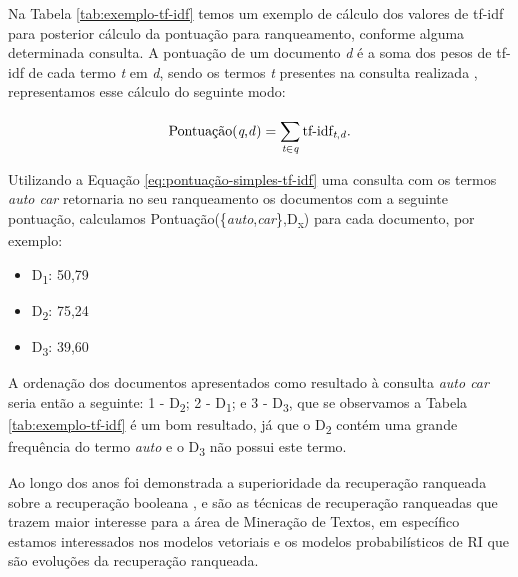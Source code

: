 

Na Tabela \ref{tab:exemplo-tf-idf} temos um exemplo de cálculo dos valores de tf-idf para posterior cálculo da pontuação para ranqueamento, conforme alguma determinada consulta. 
A pontuação de um documento \textit{d} é a soma dos pesos de tf-idf de cada termo \textit{t} em \textit{d}, sendo os termos \textit{t} presentes na consulta realizada \cite[p.~109]{Manning2008IIR}, representamos esse cálculo do seguinte modo:

\begin{equation}
    \label{eq:pontuação-simples-tf-idf}
    \text{Pontuação(\textit{q},\textit{d})} = \sum_{\textit{t} \in \textit{q}}^{} \text{tf-idf}_{\text{\textit{t},\textit{d}}}.
\end{equation}


Utilizando a Equação \ref{eq:pontuação-simples-tf-idf} uma consulta com os termos \textit{auto car} retornaria no seu ranqueamento os documentos com a seguinte pontuação, calculamos Pontuação(\{\textit{auto},\textit{car}\},D\textsubscript{x}) para cada documento, por exemplo:
\begin{itemize}
    \setlength\itemsep{-0.2em}
    \item D\textsubscript{1}: 50,79
    \item D\textsubscript{2}: 75,24
    \item D\textsubscript{3}: 39,60
\end{itemize}

A ordenação dos documentos apresentados como resultado à consulta \textit{auto car} seria então a seguinte: 1\textordmasculine{} - D\textsubscript{2}; 2\textordmasculine{} - D\textsubscript{1}; e 3\textordmasculine{} - D\textsubscript{3}, que se observamos a Tabela \ref{tab:exemplo-tf-idf} é um bom resultado, já que o D\textsubscript{2} contém uma grande frequência do termo \textit{auto} e o D\textsubscript{3} não possui este termo.


Ao longo dos anos foi demonstrada a superioridade da recuperação ranqueada sobre a recuperação booleana \cite{Jones:1981:IRE:539571}, e são as técnicas de recuperação ranqueadas que trazem maior interesse para a área de Mineração de Textos, em específico estamos interessados nos modelos vetoriais e os modelos probabilísticos de RI que são evoluções da recuperação ranqueada.

